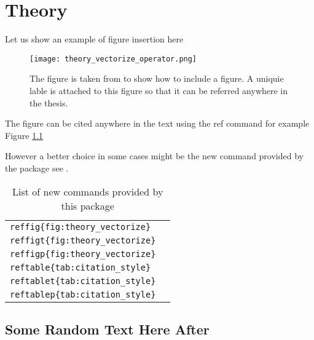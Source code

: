 \chapter{Theory}

Let us show an example of figure insertion here
\begin{figure}
	\center
	\texttt{[image: theory\_vectorize\_operator.png]}
	\caption{The figure is taken from  \cite{malkoti_algorithm_2018} 
	to show how to include a figure. 
	A uniquie lable  is attached to this figure so that it can be 
	referred anywhere in the thesis.}
	\label{fig:theory_vectorize}
\end{figure}




The figure can be cited anywhere in the text using the ref command 
for example  Figure \ref{fig:theory_vectorize}

However a better choice in some cases might be the new command provided by the package 
see .  

%
\begin{table}
\caption{ List of new commands provided by this package}
\label{tab:list_ref_cmd}
\center
\begin{tabular}{cc}
	\hline
	\verb|reffig{fig:theory_vectorize} |		&	{fig:theory_vectorize} 	\\
	\verb|reffigt{fig:theory_vectorize}|		&	{fig:theory_vectorize}	\\
	\verb|reffigp{fig:theory_vectorize}|		& 	{fig:theory_vectorize}	\\
	\verb|reftable{tab:citation_style} |		&	{tab:citation_style} \\
	\verb|reftablet{tab:citation_style}|		&	{tab:citation_style}	\\
	\verb|reftablep{tab:citation_style}|		&  	{tab:citation_style} \\
	\hline
\end{tabular}
\end{table} 

\section{Some Random Text Here After}
\lipsum[1-20]

  